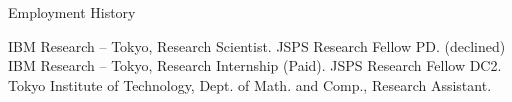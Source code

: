 \begin{rubric}{Employment History}

  \entry*[2023.04 -- now] IBM Research -- Tokyo, Research Scientist.
  \entry*[2023.04 -- 2023.4] JSPS Research Fellow PD. (declined)
  \entry*[2021.08 -- 2021.10] IBM Research -- Tokyo, Research Internship (Paid).
  \entry*[2021.04 -- 2023.3] JSPS Research Fellow DC2.
  \entry*[2020.11 -- 2023.3] Tokyo Institute of Technology, Dept. of Math. and Comp.,
  Research Assistant.
%
\end{rubric}
